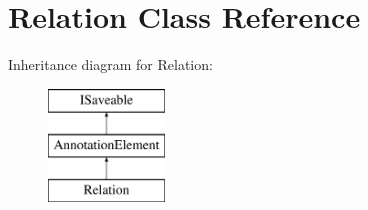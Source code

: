 \hypertarget{class_relation}{}\section{Relation Class Reference}
\label{class_relation}
Inheritance diagram for Relation\+:\begin{figure}[H]
\begin{center}
\leavevmode
\includegraphics[height=3.000000cm]{class_relation}
\end{center}
\end{figure}
